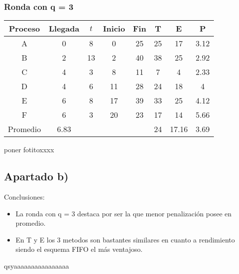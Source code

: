 \documentclass[11pt]{article}
\begin{document}
\subsubsection*{Ronda con q = 3}

\begin{center}
    \begin{tabular}{|c|c|c|c|c|c|c|c|}
        \hline
        Proceso & Llegada & $t$ & Inicio & Fin & T & E & P \\
        \hline
        A & 0 & 8 & 0 & 25 & 25 & 17 & 3.12 \\
        \hline
        B & 2 & 13 & 2 & 40 & 38 & 25 & 2.92 \\
        \hline
        C & 4 & 3 & 8 & 11 & 7 & 4 & 2.33 \\
        \hline
        D & 4 & 6 & 11 & 28 & 24 & 18 & 4 \\
        \hline
        E & 6 & 8 & 17 & 39 & 33 & 25 & 4.12 \\
        \hline
        F & 6 & 3 & 20 & 23 & 17 & 14 & 5.66 \\ 
        \hline
        Promedio & 6.83 & & & & 24 & 17.16 & 3.69 \\
        \hline
    \end{tabular}
\end{center}

poner fotitoxxxx \\

\subsection*{Apartado b)}

Conclusiones:

\begin{itemize}
    \item La ronda con q = 3 destaca por ser la que menor
          penalización posee en promedio.
    \item En T y E los 3 metodos son bastantes similares en cuanto
          a rendimiento siendo el esquema FIFO el más ventajoso.
\end{itemize}

qsyaaaaaaaaaaaaaaaa
\end{document}
